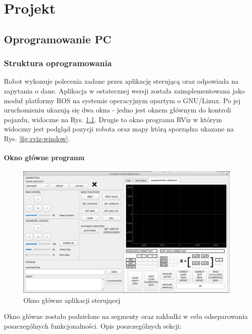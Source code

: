 \chapter{Projekt}
\section{Oprogramowanie PC}
\subsection{Struktura oprogramowania}

Robot wykonuje polecenia zadane przez aplikację sterującą oraz odpowiada na zapytania o dane. Aplikacja w ostatecznej wersji została zaimplementowana jako moduł platformy ROS\cite{ros} na systemie operacyjnym opartym o GNU/Linux. Po jej uruchomieniu ukazują się dwa okna - jedno jest oknem głównym do kontroli pojazdu, widoczne na Rys. \ref{fig:app-main-window}. Drugie to okno programu RViz w którym widoczny jest podgląd pozycji robota oraz mapy którą sporządza ukazane na Rys. \ref{fig:rviz-window}.

\subsubsection{Okno główne programu}
\begin{figure}[ht]
	\centering
		\includegraphics[width=1\linewidth]{rys/main-app-view-3.PNG}
	\caption{Okno główne aplikacji sterującej}
	\label{fig:app-main-window}
\end{figure}

Okno główne zostało podzielone na segmenty oraz zakładki w celu odseparowania poszczególnych funkcjonalności. Opis poszczególnych sekcji:

